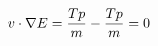 \documentclass[preview]{standalone}
\begin{document}
\begin{align*}
\special{dvisvgm:raw <g id='unique000'>}v\cdot\nabla E=\frac{Tp}{m}-\frac{Tp}{m}=0\special{dvisvgm:raw </g>}
\end{align*}
\end{document}
